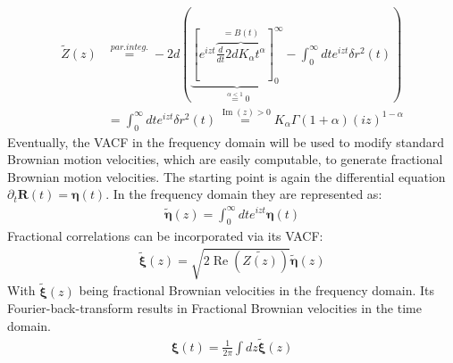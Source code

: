 \documentclass[
  a4paper,BCOR10mm,oneside,
  bibtotoc,idxtotoc,
  headsepline,footsepline,%
  fleqn,openbib
]{scrbook}
\begin{document}
\begin{align*}
 \tilde{Z}(z) & \stackrel{par. integ.}{=} - 2d \left( \underbrace{\left [ e^{izt}\overbrace{ \frac{d}{dt} 2dK_{\alpha}t^{\alpha}}^{=B(t)} \right]_{0}^{\infty}}_{\stackrel{\alpha < 1} {=} 0}-\int_{0}^{\infty} d t e^{izt} \delta r^2 (t) \right) \\
  & = \int_{0}^{\infty} d t e^{izt} \delta r^2 (t)  \stackrel{\operatorname{Im}(z)> 0} {=}  K_{\alpha} \Gamma(1+\alpha)(i z)^{1-\alpha}
\end{align*}
Eventually, the VACF in the frequency domain will be used to modify standard Brownian motion velocities, which are easily computable, to generate fractional Brownian motion velocities. The  starting point is again the differential equation $\partial_t \bm{R}(t)=\bm{\eta}(t)$. In the frequency domain they are represented as:
\begin{align}
 \tilde{\bm{\eta}}(z)=\int_{0}^{\infty} dt e^{izt} \bm{\eta}(t) \label{eq:fourier}
\end{align}
Fractional correlations can be incorporated via its VACF:
\begin{align}
\tilde{\bm{\xi}}(z) = \sqrt{2 \operatorname{Re} \left(\tilde{Z(z)}\right)}  \tilde{\bm{\eta}}(z) \label{eq:fracvacf}
\end{align}
 With $\tilde{\bm{\xi}}(z)$ being fractional Brownian velocities in the frequency domain. Its Fourier-back-transform results in Fractional Brownian velocities in the time domain.
 \begin{align}
 \bm{\xi}(t)= \frac{1}{2 \pi} \int dz\tilde{\bm{\xi}}(z)
 \end{align}
\end{document}
